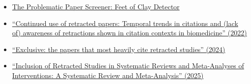 \documentclass[letterpaper, 12pt]{article}
\begin{document}
\begin{itemize}
    \setlength\itemsep{-0.5em}
    \item \href{https://dbrech.irit.fr/pls/apex/f?p=9999:31::::::}{The Problematic Paper Screener: Feet of Clay Detector}
    \item \href{https://direct.mit.edu/qss/article/2/4/1144/107356/Continued-use-of-retracted-papers-Temporal-trends}{``Continued use of retracted papers: Temporal trends in citations and (lack of) awareness of retractions shown in citation contexts in biomedicine'' (2022)}
    \item \href{https://doi.org/10.1378/chest.11-0523}{``Exclusive: the papers that most heavily cite retracted studies'' (2024)}
    \item \href{https://jamanetwork.com/journals/jamainternalmedicine/article-abstract/2831911}{``Inclusion of Retracted Studies in Systematic Reviews and Meta-Analyses of Interventions: A Systematic Review and Meta-Analysis'' (2025)}
\end{itemize}
\end{document}
